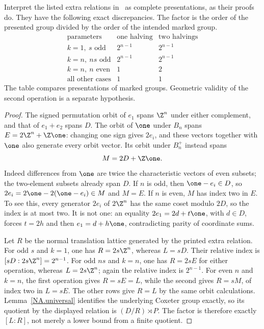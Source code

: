 \begin{proposition}\label{NA.comparison}
Interpret the listed extra relations in~\cite{PT} as complete
presentations, as their proofs do. They have the following exact
discrepancies. The factor is the order of the presented group
divided by the order of the intended marked group.
\[
\begin{array}{c|c|c}
\text{parameters}&\text{one halving}&\text{two halvings}\\\hline
k=1,\ s\text{ odd}&2^{n-1}&2^{n-1}\\
k=n,\ ns\text{ odd}&2^{n-1}&2^{n-1}\\
k=n,\ n\text{ even}&1&2\\
\text{all other cases}&1&1
\end{array}
\]
The table compares presentations of marked groups. Geometric
validity of the second operation is a separate hypothesis.
\end{proposition}
\begin{proof}
The signed permutation orbit of $e_1$ spans $\Z^n$ under
either complement, and that of $e_1+e_2$ spans $D$.
The orbit of $\one$ under $B_n$ spans
$E=2\Z^n+\Z\one$: changing one sign gives $2e_i$, and these
vectors together with $\one$ also generate every orbit vector.
Its orbit under $B_n^+$ instead spans
\[
 M=2D+\Z\one.
\]
Indeed differences from $\one$ are twice the characteristic
vectors of even subsets; the two-element subsets already span $D$.
If $n$ is odd, then $\one-e_i\in D$, so
$2e_i=2\one-2(\one-e_i)\in M$ and $M=E$.
If $n$ is even, $M$ has index two in $E$. To see this, every
generator $2e_i$ of $2\Z^n$ has the same coset modulo $2D$,
so the index is at most two. It is not one: an equality
$2e_1=2d+t\one$, with $d\in D$, forces $t=2h$ and then
$e_1=d+h\one$, contradicting parity of coordinate sums.

Let $R$ be the normal translation lattice generated by the
printed extra relation. For odd $s$ and $k=1$, one has
$R=2s\Z^n$, whereas $L=sD$. Their relative index is
$[sD:2s\Z^n]=2^{n-1}$. For odd $ns$ and $k=n$, one has
$R=2sE$ for either operation, whereas $L=2s\Z^n$;
again the relative index is $2^{n-1}$. For even $n$ and $k=n$,
the first operation gives $R=sE=L$, while the second gives
$R=sM$, of index two in $L=sE$.
The other rows give $R=L$ by the same orbit calculations.
Lemma~\ref{NA.universal} identifies the underlying Coxeter group
exactly, so its quotient by the displayed relation is
$(D/R)\rtimes P$. The factor is therefore exactly $[L:R]$,
not merely a lower bound from a finite quotient.
\end{proof}

